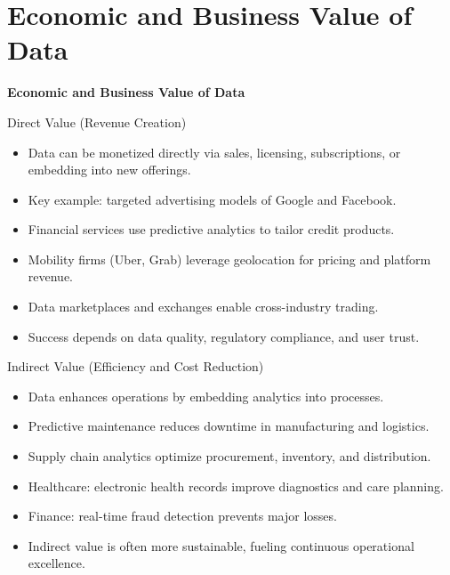\documentclass[aspectratio=169, table]{beamer}
\begin{document}
	\section{Economic and Business Value of Data}
	
	\begin{frame}{\hfill}
		\centering
		\Huge{\textbf{Economic and Business Value of Data}}
	\end{frame}
	
	\begin{frame}{Direct Value (Revenue Creation)}
		\vspace{20pt}
		\begin{itemize}
			\item Data can be monetized directly via sales, licensing, subscriptions, or embedding into new offerings.  
			\item Key example: targeted advertising models of Google and Facebook.  
			\item Financial services use predictive analytics to tailor credit products.  
			\item Mobility firms (Uber, Grab) leverage geolocation for pricing and platform revenue.  
			\item Data marketplaces and exchanges enable cross-industry trading.  
			\item Success depends on data quality, regulatory compliance, and user trust.  
		\end{itemize}
	\end{frame}
	
	\begin{frame}{Indirect Value (Efficiency and Cost Reduction)}
		\vspace{20pt}
		\begin{itemize}
			\item Data enhances operations by embedding analytics into processes.  
			\item Predictive maintenance reduces downtime in manufacturing and logistics.  
			\item Supply chain analytics optimize procurement, inventory, and distribution.  
			\item Healthcare: electronic health records improve diagnostics and care planning.  
			\item Finance: real-time fraud detection prevents major losses.  
			\item Indirect value is often more sustainable, fueling continuous operational excellence.  
		\end{itemize}
	\end{frame}
	
\end{document}
